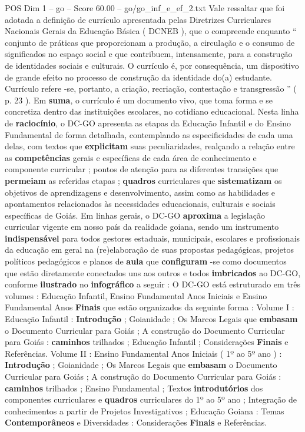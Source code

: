 \begin{textsample}{POS Dim 1 – go – Score 60.00 – go/go\_inf\_e\_ef\_2.txt}
Vale ressaltar que foi adotada a definição de currículo apresentada pelas Diretrizes Curriculares Nacionais Gerais da Educação Básica ( DCNEB ), que o compreende enquanto “ conjunto de práticas que proporcionam a produção, a circulação e o consumo de significados no espaço social e que contribuem, intensamente, para a construção de identidades sociais e culturais.
O currículo é, por consequência, um dispositivo de grande efeito no processo de construção da identidade do(a) estudante.
Currículo refere -se, portanto, a criação, recriação, contestação e transgressão ” ( p. 23 ).
Em \textbf{suma}, o currículo é um documento vivo, que toma forma e se concretiza dentro das instituições escolares, no cotidiano educacional.
Nesta linha de \textbf{raciocínio}, o DC-GO apresenta as etapas da Educação Infantil e do Ensino Fundamental de forma detalhada, contemplando as especificidades de cada uma delas, com textos que \textbf{explicitam} suas peculiaridades, realçando a relação entre as \textbf{competências} gerais e específicas de cada área de conhecimento e componente curricular ; pontos de atenção para as diferentes transições que \textbf{permeiam} as referidas etapas ; \textbf{quadros} curriculares que \textbf{sistematizam} os objetivos de aprendizagens e desenvolvimento, assim como as habilidades e apontamentos relacionados às necessidades educacionais, culturais e sociais específicas de Goiás.
Em linhas gerais, o DC-GO \textbf{aproxima} a legislação curricular vigente em nosso país da realidade goiana, sendo um instrumento \textbf{indispensável} para todos gestores estaduais, municipais, escolares e profissionais da educação em geral na (re)elaboração de suas propostas pedagógicas, projetos políticos pedagógicos e planos de \textbf{aula} que \textbf{configuram} -se como documentos que estão diretamente conectados uns aos outros e todos \textbf{imbricados} ao DC-GO, conforme \textbf{ilustrado} no \textbf{infográfico} a seguir : O DC-GO está estruturado em três volumes : Educação Infantil, Ensino Fundamental Anos Iniciais e Ensino Fundamental Anos \textbf{Finais} que estão organizados da seguinte forma : Volume I : Educação Infantil : \textbf{Introdução} ; Goianidade ; Os Marcos Legais que \textbf{embasam} o Documento Curricular para Goiás ; A construção do Documento Curricular para Goiás : \textbf{caminhos} trilhados ; Educação Infantil ; Considerações \textbf{Finais} e Referências.
Volume II : Ensino Fundamental Anos Iniciais ( 1º ao 5º ano ) : \textbf{Introdução} ; Goianidade ; Os Marcos Legais que \textbf{embasam} o Documento Curricular para Goiás ; A construção do Documento Curricular para Goiás : \textbf{caminhos} trilhados ; Ensino Fundamental ; Textos \textbf{introdutórios} dos componentes curriculares e \textbf{quadros} curriculares do 1º ao 5º ano ; Integração de conhecimentos a partir de Projetos Investigativos ; Educação Goiana : Temas \textbf{Contemporâneos} e Diversidades : Considerações \textbf{Finais} e Referências.

\end{textsample}
